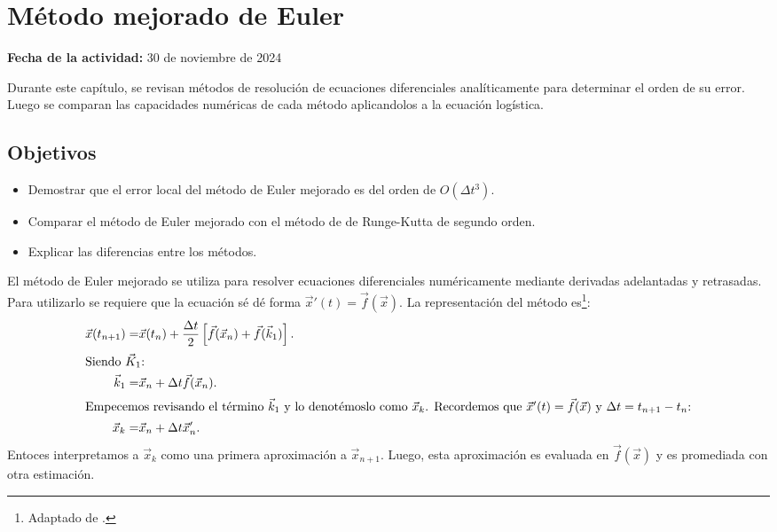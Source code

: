 \documentclass[../portafolio.tex]{subfiles}
\begin{document}
\chapter{Método mejorado de Euler}
\label{g4_ej5}
\hfill \textbf{Fecha de la actividad:} 30 de noviembre de 2024

\medskip

Durante este capítulo, se revisan métodos de resolución de ecuaciones diferenciales analíticamente para determinar el orden de su error. Luego se comparan las capacidades numéricas de cada método aplicandolos a la ecuación logística.

\section*{Objetivos}
\begin{itemize}
\item Demostrar que el error local del método de Euler mejorado es del orden de $O(\Delta
 t^3)$.
\item Comparar el método de Euler mejorado con el método de de Runge-Kutta de segundo orden.
\item Explicar las diferencias entre los métodos.
\end{itemize}
\medskip
El método de Euler mejorado se utiliza para resolver ecuaciones diferenciales numéricamente mediante derivadas adelantadas y retrasadas. Para utilizarlo se requiere que la ecuación sé dé forma $\vec{x}'(t)=\vec{f}(\vec{x})$. La representación del método es\footnote{Adaptado de \citet{strogatz}.}:
\begin{align}
\vec{x}(t_{n+1})=&\vec{x}(t_n) + \frac{\Delta t}{2}\left[ \vec{f}(\vec{x}_n)+\vec{f}(\vec{k}_1) \right].\label{g4_ej5:metodo} \\ \intertext{Siendo $\vec{K}_1$:}
\vec{k}_1=&\vec{x}_n+\Delta t \vec{f}(\vec{x}_n). \\ \intertext{Empecemos revisando el término $\vec{k}_1$ y lo denotémoslo como $\vec{x}_k$. Recordemos que $\vec{x}'(t)=\vec{f}(\vec{x})$ y $\Delta t = t_{n+1} - t_n$:}
\vec{x}_k=&\vec{x}_n + \Delta t \vec{x}'_n .
\end{align} Entoces interpretamos a $\vec{x}_k$ como una primera aproximación a $\vec{x}_{n+1}$.
Luego, esta aproximación es evaluada en $\vec{f}(\vec{x})$ y es promediada con otra estimación. 
\end{document}
